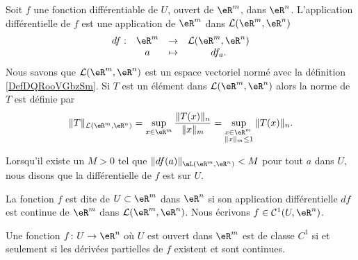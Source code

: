 Soit $f$ une fonction différentiable de $U$, ouvert de $\eR^m$, dans $\eR^n$. L'application différentielle de $f$ est une application  de $\eR^m$ dans $\mathcal{L}(\eR^m, \eR^n)$ 
\begin{equation}
  \begin{array}{rccc}
    df : & \eR^m & \to & \mathcal{L}(\eR^m, \eR^n)\\
& a& \mapsto & df_a.
  \end{array}
\end{equation}
Nous savons que $\mathcal{L}(\eR^m, \eR^n)$ est un espace vectoriel normé avec la définition \ref{DefDQRooVGbzSm}. Si $T$ est un élément dans $\mathcal{L}(\eR^m, \eR^n)$ alors la norme de $T$ est définie par 
\[
\|T\|_{\mathcal{L}(\eR^m, \eR^n)}=\sup_{x\in\eR^m} \frac{\|T(x)\|_n}{\|x\|_m}=\sup_{\begin{subarray}{l}
    x\in\eR^m\\
\|x\|_m\leq 1
  \end{subarray}} \|T(x)\|_n.
\]

Lorsqu'il existe un $M>0$ tel que $\| df(a) \|_{\aL(\eR^m,\eR^n)}<M$ pour tout $a$ dans $U$, nous disons que la différentielle de $f$ est  sur $U$.

\begin{definition}
	La fonction $f$ est dite  de $U\subset\eR^m$  dans $\eR^n$ si son application différentielle $df$ est continue de $\eR^m$ dans $\mathcal{L}(\eR^m, \eR^n)$. Nous écrivons $f\in\mathcal{C}^1(U,\eR^n)$.
\end{definition}

\begin{proposition}		\label{PropDerContCun}
	Une fonction \( f\colon U\to \eR^n\) où \( U\) est ouvert dans \( \eR^m\) est de classe \( C^1\) si et seulement si les dérivées partielles de $f$ existent et sont continues.
\end{proposition}

